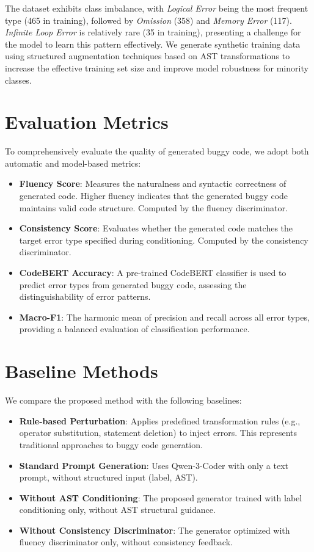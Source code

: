 The dataset exhibits class imbalance, with \textit{Logical Error} being the most frequent type (465 in training), followed by \textit{Omission} (358) and \textit{Memory Error} (117). \textit{Infinite Loop Error} is relatively rare (35 in training), presenting a challenge for the model to learn this pattern effectively. We generate synthetic training data using structured augmentation techniques based on AST transformations to increase the effective training set size and improve model robustness for minority classes.

\section{Evaluation Metrics}

To comprehensively evaluate the quality of generated buggy code, we adopt both automatic and model-based metrics:

\begin{itemize}
    \item \textbf{Fluency Score}: Measures the naturalness and syntactic correctness of generated code. Higher fluency indicates that the generated buggy code maintains valid code structure. Computed by the fluency discriminator.
    \item \textbf{Consistency Score}: Evaluates whether the generated code matches the target error type specified during conditioning. Computed by the consistency discriminator.
    \item \textbf{CodeBERT Accuracy}: A pre-trained CodeBERT classifier is used to predict error types from generated buggy code, assessing the distinguishability of error patterns.
    \item \textbf{Macro-F1}: The harmonic mean of precision and recall across all error types, providing a balanced evaluation of classification performance.
\end{itemize}

\section{Baseline Methods}

We compare the proposed method with the following baselines:

\begin{itemize}
    \item \textbf{Rule-based Perturbation}: Applies predefined transformation rules (e.g., operator substitution, statement deletion) to inject errors. This represents traditional approaches to buggy code generation.
    \item \textbf{Standard Prompt Generation}: Uses Qwen-3-Coder with only a text prompt, without structured input (label, AST).
    \item \textbf{Without AST Conditioning}: The proposed generator trained with label conditioning only, without AST structural guidance.
    \item \textbf{Without Consistency Discriminator}: The generator optimized with fluency discriminator only, without consistency feedback.
\end{itemize}

